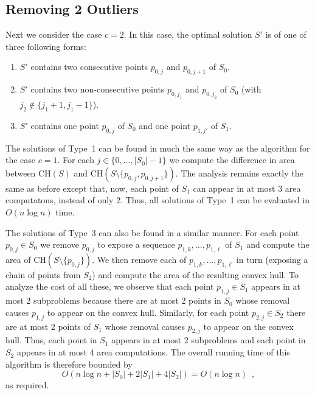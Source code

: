 \documentclass[lotsofwhite]{patmorin}
\newcommand{\ch}{\mathrm{CH}}
\begin{document}
\subsection{Removing 2 Outliers}

Next we consider the case $c=2$.  In this case, the optimal solution
$S'$ is of one of three following forms:

\begin{enumerate}

\item $S'$ contains two consecutive points $p_{0,j}$ and $p_{0,j+1}$
of $S_0$.

\item $S'$ contains two non-consecutive points $p_{0,j_1}$ and
$p_{0,j_2}$ of $S_0$ (with $j_2\not\in\{j_1+1,j_1-1\}$).

\item $S'$ contains one point $p_{0,j}$ of $S_0$ and one point
$p_{1,j'}$ of $S_1$.

\end{enumerate}

The solutions of Type~1 can be found in much the same way as the
algorithm for the case $c=1$.  For each $j\in\{0,\ldots,|S_0|-1\}$ we
compute the difference in area between $\ch(S)$ and
$\ch(S\setminus\{p_{0,j},p_{0,j+1}\})$.  The analysis remains exactly
the same as before except that, now, each point of $S_1$ can appear in
at most $3$ area computatons, instead of only 2.  Thus, all solutions
of Type~1 can be evaluated in $O(n\log n)$ time.

The solutions of Type~3 can also be found in a similar manner.  For
each point $p_{0,j}\in S_0$ we remove $p_{0,j}$ to expose a sequence
$p_{1,k},\ldots,p_{1,\ell}$ of $S_1$ and compute the area of
$\ch(S\setminus\{p_{0,j}\})$.  We then remove each of
$p_{1,k},\ldots,p_{1,\ell}$ in turn (exposing a chain of points from
$S_2$) and compute the area of the resulting convex hull.  To analyze
the cost of all these, we observe that each point $p_{1,j}\in S_1$
appears in at most 2 subproblems because there are at most 2 points in
$S_0$ whose removal causes $p_{1,j}$ to appear on the convex hull.
Similarly, for each point $p_{2,j}\in S_2$ there are at most 2 points
of $S_1$ whose removal causes $p_{2,j}$ to appear on the convex hull.
Thus, each point in $S_1$ appears in at most 2 subproblems and each
point in $S_2$ appears in at most $4$ area computations.  The overall
running time of this algorithm is therefore bounded by
\[
    O\left(n\log n + |S_0| + 2|S_1| + 4|S_2|\right) = O(n\log n) \enspace ,
\]
as required.
\end{document}
